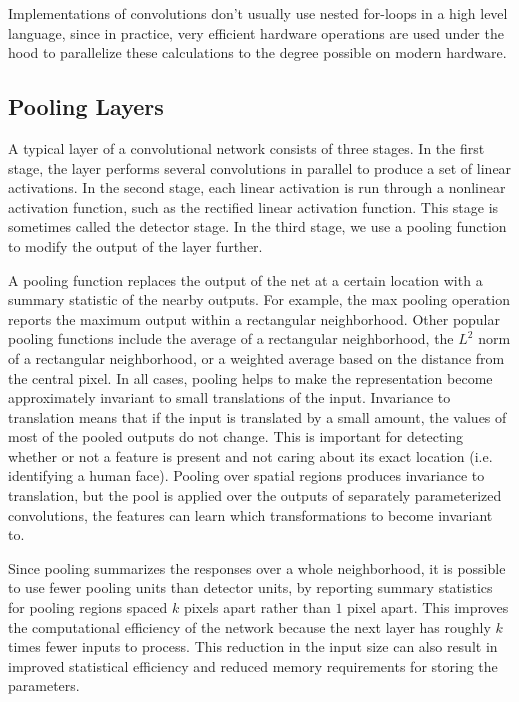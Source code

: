 \documentclass[book.tex]{subfiles}
\begin{document}
Implementations of convolutions don't usually use nested for-loops in a high level language, since in practice, very efficient hardware operations are used under the hood to parallelize these calculations to the degree possible on modern hardware.

\subsection{Pooling Layers}
A typical layer of a convolutional network consists of three stages. In the first stage, the layer performs several convolutions in parallel to produce a set of linear activations. In the second stage, each linear activation is run through a nonlinear activation function, such as the rectified linear activation function. This stage is sometimes called the detector stage. In the third stage, we use a pooling function to modify the output of the layer further.

A pooling function replaces the output of the net at a certain location with a summary statistic of the nearby outputs. For example, the max pooling operation reports the maximum output within a rectangular neighborhood. Other popular pooling functions include the average of a rectangular neighborhood, the $L^2$ norm of a rectangular neighborhood, or a weighted average based on the distance from the central pixel. In all cases, pooling helps to make the representation become approximately invariant to small translations of the input. Invariance to translation means that if the input is translated by a small amount, the values of most of the pooled outputs do not change. This is important for detecting whether or not a feature is present and not caring about its exact location (i.e. identifying a human face). Pooling over spatial regions produces invariance to translation, but the pool is applied over the outputs of separately parameterized convolutions, the features can learn which transformations to become invariant to.

Since pooling summarizes the responses over a whole neighborhood, it is possible to use fewer pooling units than detector units, by reporting summary statistics for pooling regions spaced $k$ pixels apart rather than $1$ pixel apart. This improves the computational efficiency of the network because the next layer has roughly $k$ times fewer inputs to process. This reduction in the input size can also result in improved statistical efficiency and reduced memory requirements for storing the parameters.
\end{document}
